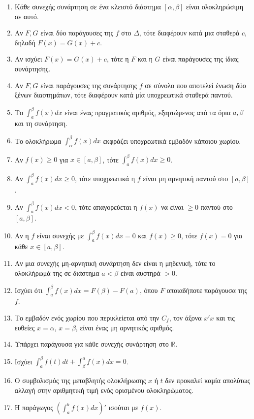 \documentclass[11pt,a4paper]{article}
\newcommand{\dint}{\displaystyle\int}
\begin{document}
\begin{enumerate}[label=\textbf{3.\arabic*.}]
    \item Κάθε συνεχής συνάρτηση σε ένα κλειστό διάστημα $[\alpha, \beta]$ είναι ολοκληρώσιμη σε αυτό.
    \item Αν $F, G$ είναι δύο παράγουσες της $f$ στο $\Delta$, τότε διαφέρουν κατά μια σταθερά $c$, δηλαδή $F(x) = G(x) + c$.
    \item Αν ισχύει $F(x) = G(x) + c$, τότε η $F$ και η $G$ είναι παράγουσες της ίδιας συνάρτησης.
    \item Αν $F, G$ είναι παράγουσες της συνάρτησης $f$ σε σύνολο που αποτελεί ένωση δύο ξένων διαστημάτων, τότε διαφέρουν κατά μία υποχρεωτικά σταθερά παντού.
    \item Το $\dint_a^\beta f(x) dx$ είναι ένας πραγματικός αριθμός, εξαρτώμενος από τα όρια $a, \beta$ και τη συνάρτηση.
    \item Το ολοκλήρωμα $\dint_{\alpha}^{\beta} f(x) dx$ εκφράζει υποχρεωτικά εμβαδόν κάποιου χωρίου.
    \item Αν $f(x) \ge 0$ για $x \in [a, \beta]$, τότε $\dint_a^\beta f(x) dx \ge 0$.
    \item Αν $\dint_a^\beta f(x) dx \ge 0$, τότε υποχρεωτικά η $f$ είναι μη αρνητική παντού στο $[a, \beta]$.
    \item Αν $\dint_a^\beta f(x) dx < 0$, τότε απαγορεύεται η $f(x)$ να είναι $\ge 0$ παντού στο $[a, \beta]$.
    \item Αν η $f$ είναι συνεχής με $\dint_a^\beta f(x) dx = 0$ και $f(x) \ge 0$, τότε $f(x) = 0$ για κάθε $x \in [a, \beta]$.
    \item Αν μια συνεχής μη-αρνητική συνάρτηση δεν είναι η μηδενική, τότε το ολοκλήρωμά της σε διάστημα $a<\beta$ είναι αυστηρά $> 0$.
    \item Ισχύει ότι $\dint_a^\beta f(x) dx = F(\beta) - F(a)$, όπου $F$ οποιαδήποτε παράγουσα της $f$.
    \item Το εμβαδόν ενός χωρίου που περικλείεται από την $C_f$, τον άξονα $x'x$ και τις ευθείες $x=\alpha$, $x=\beta$, είναι ένας μη αρνητικός αριθμός.
    \item Υπάρχει παράγουσα για κάθε συνεχής συνάρτηση στο $\mathbb{R}$.
    \item Ισχύει $\dint_a^\beta f(t) dt + \dint_\beta^a f(x) dx = 0$.
    \item Ο συμβολισμός της μεταβλητής ολοκλήρωσης $x$ ή $t$ δεν προκαλεί καμία απολύτως αλλαγή στην αριθμητική τιμή ενός ορισμένου ολοκληρώματος.
    \item Η παράγωγος $\left(\dint_a^b f(x) dx \right)'$ ισούται με $ f(x)$.

\end{enumerate}
\end{document}
